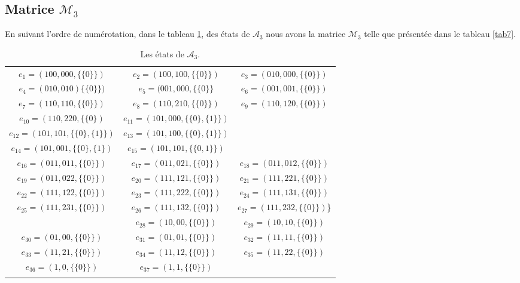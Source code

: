 \normalsize
 \begin{spacing}{0.30}
\subsection*{Matrice $\mathcal{M}_{3}$}
 \end{spacing}
En suivant l'ordre de numérotation, dans le tableau \ref{tab6},  des états de $\mathcal{A}_{3}$ nous avons la matrice $\mathcal{M}_{3}$ telle que présentée dans le tableau \ref{tab7}.
\small
\begin{longtable}{|c|c|c|} 
\hline
$e_{1}=(100,000,\{\{0\}\})$&
$e_{2}=(100,100,\{\{0\}\})$&
$e_{3}=(010,000,\{\{0\}\})$\\
$e_{4}=(010,010)\{\{0\}\})$&
$e_{5}=(001,000,\{\{0\}\}$&
$e_{6}=(001,001,\{\{0\}\})$\\
$e_{7}=(110,110,\{\{0\}\})$&
$e_{8}=(110,210,\{\{0\}\})$&
$e_{9}=(110,120,\{\{0\}\})$\\
$e_{10}=(110,220,\{\{0\})$&
$e_{11}=(101,000,\{\{0\},\{1\}\})$& \\
$e_{12}=(101,101,\{\{0\},\{1\}\})$ &
$e_{13}=(101,100,\{\{0\},\{1\}\})$& \\
$e_{14}=(101,001,\{\{0\},\{1\})$&
$e_{15}=(101,101,\{\{0,1\}\})$ &\\
$e_{16}=(011,011,\{\{0\}\})$&
$e_{17}=(011,021,\{\{0\}\})$&
$e_{18}=(011,012,\{\{0\}\})$\\
$e_{19}=(011,022,\{\{0\}\})$&
$e_{20}=(111,121,\{\{0\}\})$&
$e_{21}=(111,221,\{\{0\}\})$\\
$e_{22}=(111,122,\{\{0\}\})$&
$e_{23}=(111,222,\{\{0\}\})$&
$e_{24}=(111,131,\{\{0\}\})$\\
$e_{25}=(111,231,\{\{0\}\})$&
$e_{26}=(111,132,\{\{0\}\})$&
$e_{27}=(111,232,\{\{0\}\})$\}\\
&
$e_{28}=(10,00,\{\{0\}\})$&
$e_{29}=(10,10,\{\{0\}\})$\\
$e_{30}=(01,00,\{\{0\}\})$&
$e_{31}=(01,01,\{\{0\}\})$&
$e_{32}=(11,11,\{\{0\}\})$\\
$e_{33}=(11,21,\{\{0\}\})$&
$e_{34}=(11,12,\{\{0\}\})$&
$e_{35}=(11,22,\{\{0\}\})$\\
$e_{36}=(1,0,\{\{0\}\})$ &
$e_{37}=(1,1,\{\{0\}\})$ & \\
\hline
\caption{\label{tab6} Les états de $\mathcal{A}_{3}$.}
\end{longtable}
\normalsize
\tiny
